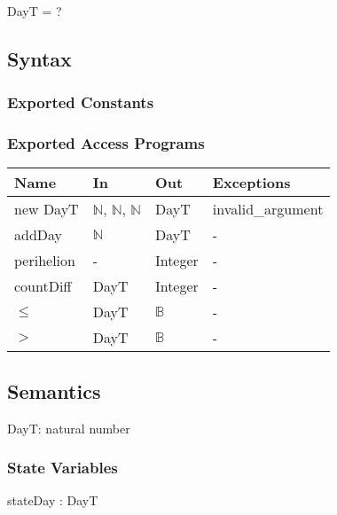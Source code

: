 \documentclass[12pt, titlepage]{article}
\begin{document}
DayT = ? \\

\subsection{Syntax}

\subsubsection{Exported Constants}


\subsubsection{Exported Access Programs}

\begin{center}
\begin{tabular}{p{3cm} p{5cm} p{4cm} p{2cm}}
\hline
\textbf{Name} & \textbf{In} & \textbf{Out} & \textbf{Exceptions} \\
\hline
new DayT& $\mathbb{N}$, $\mathbb{N}$, $\mathbb{N}$ & DayT & invalid\_argument \\
addDay &  $\mathbb{N}$  & DayT & - \\
perihelion &  -  & Integer & - \\
countDiff &  DayT  & Integer & - \\
$\leq$ &  DayT  & $\mathbb{B}$ & - \\
$>$ &  DayT  & $\mathbb{B}$ & - \\
\hline
\end{tabular}
\end{center}

 

\subsection{Semantics}
DayT: natural number

\subsubsection{State Variables}

stateDay : DayT \\
\end{document}

